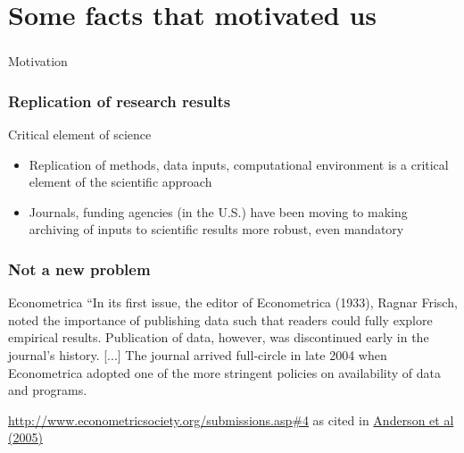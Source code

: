 %
%
%
\section[Motivation]{Some facts that motivated us}


\begin{frame}
\frametitle{}
\begin{block}{Motivation}

\end{block}
\end{frame}

\begin{frame}
\frametitle{Replication of research results}
\begin{block}{Critical element of science}
\begin{itemize}
\item Replication of methods, data inputs, computational environment is a critical element of the scientific approach
\item Journals, funding agencies (in the U.S.) have been moving to making archiving of inputs to scientific results more robust, even mandatory
\end{itemize}
\end{block}
\end{frame}

\begin{frame}
\frametitle{Not a new problem}
\begin{block}{Econometrica}
``In its first issue, the editor of Econometrica (1933), Ragnar Frisch, noted
the importance of publishing data such that readers could fully explore
empirical results.  Publication of data, however, was discontinued early in
the journal's history.  [...]  The journal arrived full-circle in late 2004 when Econometrica
adopted one of the more stringent policies on availability of data and
programs.
\end{block}
\tiny \href{http://www.econometricsociety.org/submissions.asp\#4}{http://www.econometricsociety.org/submissions.asp\#4} as cited in \href{http://research.stlouisfed.org/wp/2005/2005-014.pdf}{Anderson et al (2005)}
\end{frame}

